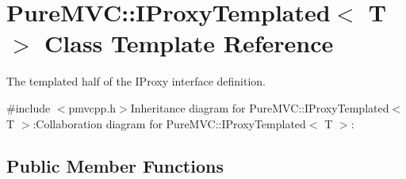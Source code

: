 \hypertarget{class_pure_m_v_c_1_1_i_proxy_templated}{
\section{PureMVC::IProxyTemplated$<$ T $>$ Class Template Reference}
\label{class_pure_m_v_c_1_1_i_proxy_templated}
}


The templated half of the {\ttfamily IProxy} interface definition.  


{\ttfamily \#include $<$pmvcpp.h$>$}Inheritance diagram for PureMVC::IProxyTemplated$<$ T $>$:Collaboration diagram for PureMVC::IProxyTemplated$<$ T $>$:\subsection*{Public Member Functions}
